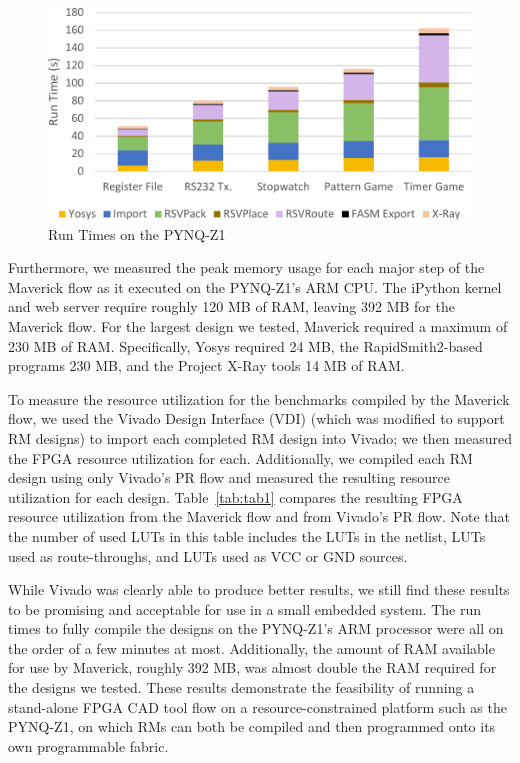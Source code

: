 \begin{figure}
	\centering
	\includegraphics[width=\columnwidth]{figures/runtime}
	\caption{Run Times on the PYNQ-Z1}
	\label{fig:runtime}
\end{figure}

Furthermore, we measured the peak memory usage for each major step of the Maverick flow as it executed on the PYNQ-Z1's ARM CPU. 
The iPython kernel and web server require roughly 120 MB of RAM, leaving 392 MB for the Maverick flow.
For the largest design we tested, Maverick required a maximum of 230 MB of RAM. 
Specifically, Yosys required 24 MB, the RapidSmith2-based programs 230 MB, and the Project X-Ray tools 14 MB of RAM.

To measure the resource utilization for the benchmarks compiled by the Maverick flow, we used the Vivado Design Interface (VDI) \cite{Townsend:2017b} (which was modified to support RM designs) to import each completed RM design into Vivado; we then measured the FPGA resource utilization for each.
Additionally, we compiled each RM design using only Vivado's PR flow and measured the resulting resource utilization for each design.
Table~\ref{tab:tab1} compares the resulting FPGA resource utilization from the Maverick flow and from Vivado's PR flow.
Note that the number of used LUTs in this table includes the LUTs in the netlist, LUTs used as route-throughs, and LUTs used as VCC or GND sources.

While Vivado was clearly able to produce better results, we still find these results to be promising and acceptable for use in a small embedded system.
The run times to fully compile the designs on the PYNQ-Z1's ARM processor were all on the order of a few minutes at most.
Additionally, the amount of RAM available for use by Maverick, roughly 392 MB, was almost double the RAM required for the designs we tested.
These results demonstrate the feasibility of running a stand-alone FPGA CAD tool flow on a resource-constrained platform such as the PYNQ-Z1, on which RMs can both be compiled and then programmed onto its own programmable fabric.

